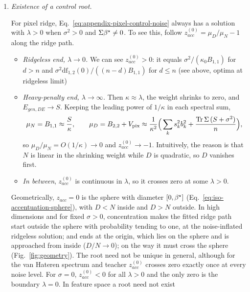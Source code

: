 \begin{remark}
\begin{enumerate}
\item \emph{Existence of a control root.}  {For pixel ridge, Eq.~\ref{eq:appendix-pixel-control-noise} always has a solution with $\lambda>0$ when $\sigma^2>0$ and $\Sigma{\beta^{\star}}\ne0$.  To see this, follow $z^{(0)}_{acc}=\mu_D/\mu_N-1$ along the ridge path.
\begin{itemize}
\item \emph{Ridgeless end, $\lambda\to0$.}  We can see 
$z^{(0)}_{acc}>0$: it equals $\sigma^2/(\kappa_0B_{1,1})$ for $d>n$ and $\sigma^2\mathrm{df}_{1,2}(0)/((n-d)B_{1,1})$ for
$d\le n$ (see above, optima at ridgeless limit)
\item \emph{Heavy-penalty end, $\lambda\to\infty$.}  Then $\kappa\approx\lambda$,
the weight shrinks to zero, and $E_{gen,DE}\to S$.  Keeping the leading power
of $1/\kappa$ in each spectral sum,
\[
\mu_N=B_{1,1}\approx\frac{S}{\kappa},\qquad
\mu_D=B_{2,2}+V_{\rm pix}\approx\frac1{\kappa^2}
\Big(\sum_ks_k^2b_k^2+\frac{\operatorname{Tr}\Sigma\,(S+\sigma^2)}{n}\Big),
\]
so $\mu_D/\mu_N=O(1/\kappa)\to0$ and $z^{(0)}_{acc}\to-1$.  
Intuitively, the reason is that $N$ is linear in the shrinking weight while $D$ is quadratic, so $D$ vanishes first.
\item \emph{In between}, $z^{(0)}_{acc}$ is continuous in $\lambda$, so it
crosses zero at some $\lambda>0$.
\end{itemize}
Geometrically, $z_{acc}=0$ is the sphere with diameter $[0,{\beta^{\star}}]$
(Eq.~\ref{eq:iso-accentuation-sphere}), with $D<N$ inside and $D>N$ outside. 
In high dimensions and for fixed $\sigma>0$, concentration makes the fitted ridge path start outside the sphere with probability tending to one, at the noise-inflated ridgeless solution; 
and ends at the origin, which lies on the sphere and is approached from inside ($D/N\to0$); on the way it must cross the sphere (Fig.~\ref{fig:geometry}).  
The root need not be unique in general, although for the van Hateren spectrum and teacher $z^{(0)}_{acc}$ crosses zero exactly once at every noise level.
For $\sigma=0$, $z^{(0)}_{acc}<0$ for all $\lambda>0$ and the only zero is the boundary $\lambda=0$.  In feature space a root need not exist
}
\end{enumerate}
\end{remark}

